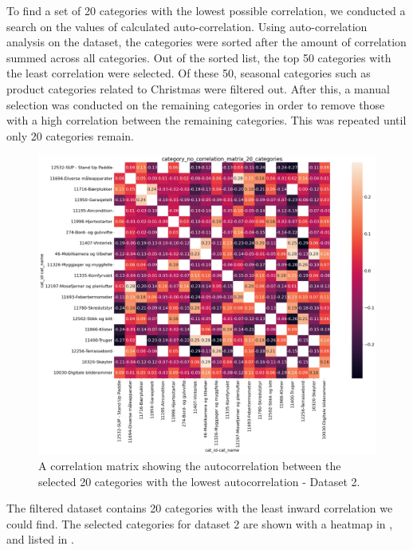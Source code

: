 To find a set of 20 categories with the lowest possible correlation, we conducted a search on the values of calculated auto-correlation.
Using auto-correlation analysis on the dataset, the categories were sorted after the amount of correlation summed across all categories.
Out of the sorted list, the top 50 categories with the least correlation were selected.
Of these 50, seasonal categories such as product categories related to Christmas were filtered out.
After this, a manual selection was conducted on the remaining categories in order to remove those with a high correlation between the remaining categories.
This was repeated until only 20 categories remain.
\begin{figure}[H]
  \centering
  \includegraphics[width=\textwidth]{./figs/dataset/category_no_correlation_matrix_20_categories.png}
  \hfill
  \caption{A correlation matrix showing the autocorrelation between the selected 20 categories with the lowest autocorrelation - Dataset 2.}
  \label{fig:dataset:heatmap_20_no_correlating}
\end{figure}



The filtered dataset contains 20 categories with the least inward correlation we could find.
The selected categories for dataset 2 are shown with a heatmap in ,
and listed in .

